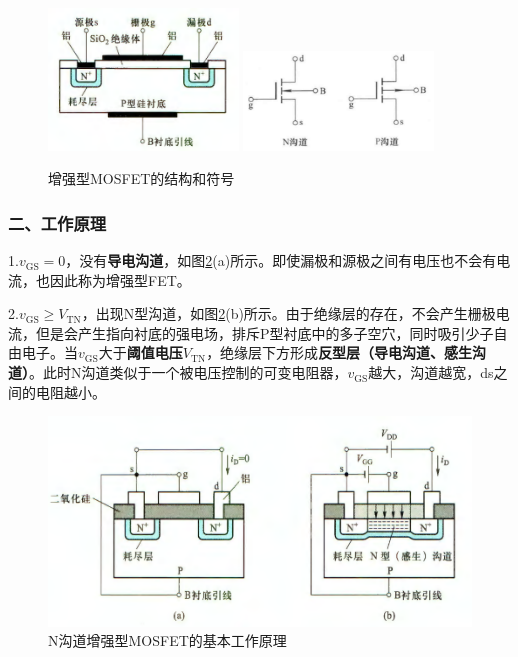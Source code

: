 \begin{figure}[htb]
    \centering
        {\includegraphics[width=0.45\textwidth]{pic/N沟道增强型MOSFET结构.png}}\qquad
        {\includegraphics[width=0.45\textwidth]{pic/N沟道增强型MOSFET符号.png}}
        \caption{增强型MOSFET的结构和符号\label{N沟道增强型MOSFET}}
\end{figure}

\subsubsection{二、工作原理}
1.$v_{\mathrm{GS}}=0$，没有\textbf{导电沟道}，如图\ref{N沟道增强型MOSFET的基本工作原理}(a)所示。即使漏极和源极之间有电压也不会有电流，也因此称为增强型FET。

2.$v_{\mathrm{GS}}\geq V_{\mathrm{TN}}$，出现N型沟道，如图\ref{N沟道增强型MOSFET的基本工作原理}(b)所示。由于绝缘层的存在，不会产生栅极电流，但是会产生指向衬底的强电场，排斥P型衬底中的多子空穴，同时吸引少子自由电子。当$v_{\mathrm{GS}}$大于\textbf{阈值电压}$V_{\mathrm{TN}}$，绝缘层下方形成\textbf{反型层（导电沟道、感生沟道）}。此时N沟道类似于一个被电压控制的可变电阻器，$v_{\mathrm{GS}}$越大，沟道越宽，ds之间的电阻越小。

\begin{figure}[htb]
    \centering
    \includegraphics[width=0.65\linewidth]{pic/N沟道增强型MOSFET的基本工作原理.png}
    \caption{N沟道增强型MOSFET的基本工作原理\cite{康华光}\label{N沟道增强型MOSFET的基本工作原理}}
\end{figure}


